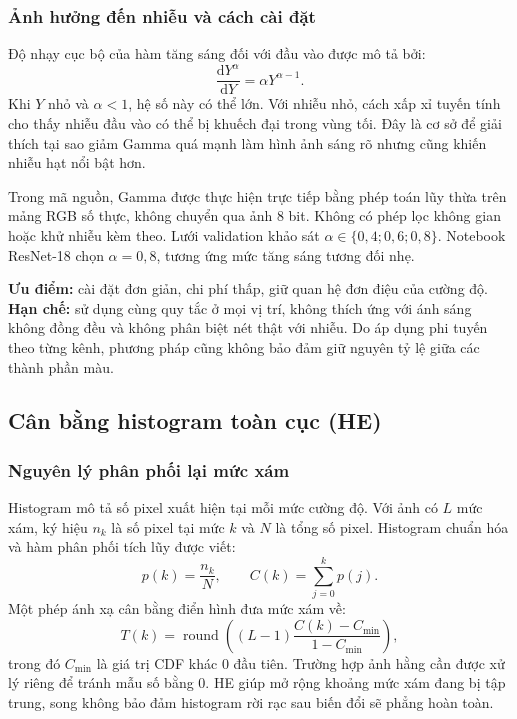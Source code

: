 \subsubsection{Ảnh hưởng đến nhiễu và cách cài đặt}
Độ nhạy cục bộ của hàm tăng sáng đối với đầu vào được mô tả bởi:
\begin{equation}
\frac{\mathrm{d}Y^\alpha}{\mathrm{d}Y}=\alpha Y^{\alpha-1}.
\end{equation}
Khi $Y$ nhỏ và $\alpha<1$, hệ số này có thể lớn. Với nhiễu nhỏ, cách xấp xỉ tuyến tính cho thấy nhiễu đầu vào có thể bị khuếch đại trong vùng tối. Đây là cơ sở để giải thích tại sao giảm Gamma quá mạnh làm hình ảnh sáng rõ nhưng cũng khiến nhiễu hạt nổi bật hơn.

Trong mã nguồn, Gamma được thực hiện trực tiếp bằng phép toán lũy thừa trên mảng RGB số thực, không chuyển qua ảnh 8 bit. Không có phép lọc không gian hoặc khử nhiễu kèm theo. Lưới validation khảo sát $\alpha\in\{0,4;0,6;0,8\}$. Notebook ResNet-18 chọn $\alpha=0,8$, tương ứng mức tăng sáng tương đối nhẹ.

\textbf{Ưu điểm:} cài đặt đơn giản, chi phí thấp, giữ quan hệ đơn điệu của cường độ. \textbf{Hạn chế:} sử dụng cùng quy tắc ở mọi vị trí, không thích ứng với ánh sáng không đồng đều và không phân biệt nét thật với nhiễu. Do áp dụng phi tuyến theo từng kênh, phương pháp cũng không bảo đảm giữ nguyên tỷ lệ giữa các thành phần màu.

\subsection{Cân bằng histogram toàn cục (HE)}
\subsubsection{Nguyên lý phân phối lại mức xám}
Histogram mô tả số pixel xuất hiện tại mỗi mức cường độ. Với ảnh có $L$ mức xám, ký hiệu $n_k$ là số pixel tại mức $k$ và $N$ là tổng số pixel. Histogram chuẩn hóa và hàm phân phối tích lũy được viết:
\begin{equation}
p(k)=\frac{n_k}{N},\qquad C(k)=\sum_{j=0}^{k}p(j).
\end{equation}
Một phép ánh xạ cân bằng điển hình đưa mức xám về:
\begin{equation}
T(k)=\operatorname{round}\!\left((L-1)\frac{C(k)-C_{\min}}{1-C_{\min}}\right),
\label{eq:he}
\end{equation}
trong đó $C_{\min}$ là giá trị CDF khác 0 đầu tiên. Trường hợp ảnh hằng cần được xử lý riêng để tránh mẫu số bằng 0. HE giúp mở rộng khoảng mức xám đang bị tập trung, song không bảo đảm histogram rời rạc sau biến đổi sẽ phẳng hoàn toàn.

